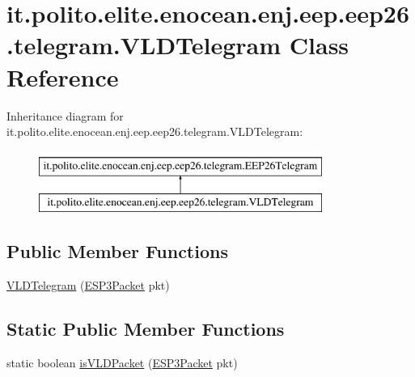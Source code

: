\hypertarget{classit_1_1polito_1_1elite_1_1enocean_1_1enj_1_1eep_1_1eep26_1_1telegram_1_1_v_l_d_telegram}{}\section{it.\+polito.\+elite.\+enocean.\+enj.\+eep.\+eep26.\+telegram.\+V\+L\+D\+Telegram Class Reference}
\label{classit_1_1polito_1_1elite_1_1enocean_1_1enj_1_1eep_1_1eep26_1_1telegram_1_1_v_l_d_telegram}
Inheritance diagram for it.\+polito.\+elite.\+enocean.\+enj.\+eep.\+eep26.\+telegram.\+V\+L\+D\+Telegram\+:\begin{figure}[H]
\begin{center}
\leavevmode
\includegraphics[height=2.000000cm]{classit_1_1polito_1_1elite_1_1enocean_1_1enj_1_1eep_1_1eep26_1_1telegram_1_1_v_l_d_telegram}
\end{center}
\end{figure}
\subsection*{Public Member Functions}
\begin{DoxyCompactItemize}
\item 
\hyperlink{classit_1_1polito_1_1elite_1_1enocean_1_1enj_1_1eep_1_1eep26_1_1telegram_1_1_v_l_d_telegram_ac25fd48a7deda22319e29ba018e27568}{V\+L\+D\+Telegram} (\hyperlink{classit_1_1polito_1_1elite_1_1enocean_1_1protocol_1_1serial_1_1v3_1_1network_1_1packet_1_1_e_s_p3_packet}{E\+S\+P3\+Packet} pkt)
\end{DoxyCompactItemize}
\subsection*{Static Public Member Functions}
\begin{DoxyCompactItemize}
\item 
static boolean \hyperlink{classit_1_1polito_1_1elite_1_1enocean_1_1enj_1_1eep_1_1eep26_1_1telegram_1_1_v_l_d_telegram_aa53b4e6c52d31cc6d3ad0761436a52a8}{is\+V\+L\+D\+Packet} (\hyperlink{classit_1_1polito_1_1elite_1_1enocean_1_1protocol_1_1serial_1_1v3_1_1network_1_1packet_1_1_e_s_p3_packet}{E\+S\+P3\+Packet} pkt)
\end{DoxyCompactItemize}
